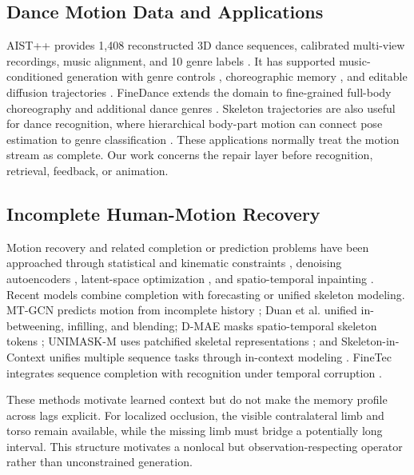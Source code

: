 \documentclass[fractalfract,article,submit,moreauthors,pdftex]{Definitions/mdpi}
\begin{document}
\subsection{Dance Motion Data and Applications}

AIST++ provides 1,408 reconstructed 3D dance sequences, calibrated multi-view recordings, music alignment, and 10 genre labels \cite{li2021aist}. It has supported music-conditioned generation with genre controls \cite{kim2022dance}, choreographic memory \cite{siyao2022bailando}, and editable diffusion trajectories \cite{tseng2023edge}. FineDance extends the domain to fine-grained full-body choreography and additional dance genres \cite{li2023finedance}. Skeleton trajectories are also useful for dance recognition, where hierarchical body-part motion can connect pose estimation to genre classification \cite{hu2021dance}. These applications normally treat the motion stream as complete. Our work concerns the repair layer before recognition, retrieval, feedback, or animation.

\subsection{Incomplete Human-Motion Recovery}

Motion recovery and related completion or prediction problems have been approached through statistical and kinematic constraints \cite{xia2016recovery}, denoising autoencoders \cite{carissimi2018gaps}, latent-space optimization \cite{lohit2021latent}, and spatio-temporal inpainting \cite{hernandez2019inpainting}. Recent models combine completion with forecasting or unified skeleton modeling. MT-GCN predicts motion from incomplete history \cite{cui2021mtgcn}; Duan et al. \cite{duan2022completion} unified in-betweening, infilling, and blending; D-MAE masks spatio-temporal skeleton tokens \cite{jiang2022dmae}; UNIMASK-M uses patchified skeletal representations \cite{mascaro2024unimask}; and Skeleton-in-Context unifies multiple sequence tasks through in-context modeling \cite{wang2024sic}. FineTec integrates sequence completion with recognition under temporal corruption \cite{shao2026finetec}.

These methods motivate learned context but do not make the memory profile across lags explicit. For localized occlusion, the visible contralateral limb and torso remain available, while the missing limb must bridge a potentially long interval. This structure motivates a nonlocal but observation-respecting operator rather than unconstrained generation.
\end{document}
